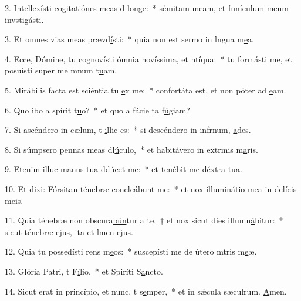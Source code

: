 2. Intellexísti cogitatiónes meas d l\uline{o}nge:~* sémitam meam, et funículum meum invstig\uline{á}sti.\par 
3. Et omnes vias meas prævd\uline{í}sti:~* quia non est sermo in lngua m\uline{e}a.\par 
4. Ecce, Dómine, tu cognovísti ómnia novíssima, et nt\uline{í}qua:~* tu formásti me, et posuísti super me mnum t\uline{u}am.\par 
5. Mirábilis facta est sciéntia tu \uline{e}x me:~* confortáta est, et non póter ad \uline{e}am.\par 
6. Quo ibo a spírit t\uline{u}o?~* et quo a fácie ta f\uline{ú}giam?\par 
7. Si ascéndero in cælum, t \uline{i}llic es:~* si descéndero in infrnum, \uline{a}des.\par 
8. Si súmpsero pennas meas dl\uline{ú}culo,~* et habitávero in extrmis m\uline{a}ris.\par 
9. Etenim illuc manus tua dd\uline{ú}cet me:~* et tenébit me déxtra t\uline{u}a.\par 
10. Et dixi: Fórsitan ténebræ conclc\uline{á}bunt me:~* et nox illuminátio mea in delícis m\uline{e}is.\par 
11. Quia ténebræ non obscura\uline{bún}tur a te,~† et nox sicut dies illumn\uline{á}bitur:~* sicut ténebræ ejus, ita et lmen \uline{e}jus.\par 
12. Quia tu possedísti rens m\uline{e}os:~* suscepísti me de útero mtris m\uline{e}æ.\par 
13. Glória Patri, t F\uline{í}lio,~* et Spiríti S\uline{a}ncto.\par 
14. Sicut erat in princípio, et nunc, t s\uline{e}mper,~* et in sǽcula sæculrum. \uline{A}men.\par 
